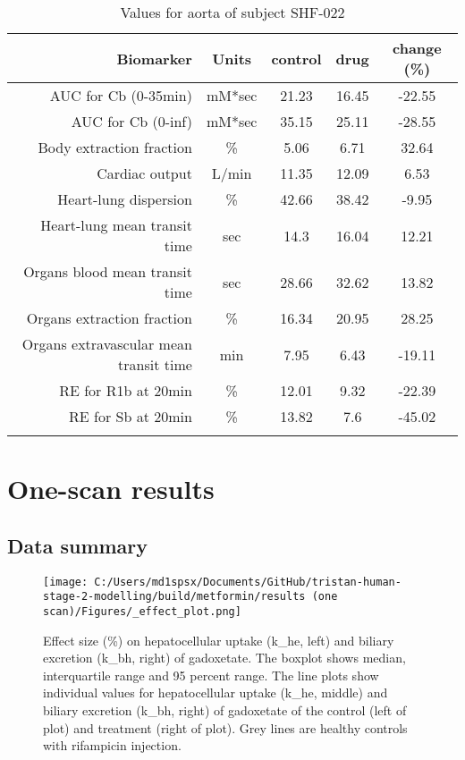 \documentclass{epflreport}%
\begin{document}
\begin{longtable}{rcccc}%
\hline%
Biomarker&Units&control&drug&change (\%)\\%
\hline%
AUC for Cb (0{-}35min)&mM*sec&21.23&16.45&{-}22.55\\%
AUC for Cb (0{-}inf)&mM*sec&35.15&25.11&{-}28.55\\%
Body extraction fraction&\%&5.06&6.71&32.64\\%
Cardiac output&L/min&11.35&12.09&6.53\\%
Heart{-}lung dispersion&\%&42.66&38.42&{-}9.95\\%
Heart{-}lung mean transit time&sec&14.3&16.04&12.21\\%
Organs blood mean transit time&sec&28.66&32.62&13.82\\%
Organs extraction fraction&\%&16.34&20.95&28.25\\%
Organs extravascular mean transit time&min&7.95&6.43&{-}19.11\\%
RE for R1b at 20min&\%&12.01&9.32&{-}22.39\\%
RE for Sb at 20min&\%&13.82&7.6&{-}45.02\\%
\hline%
\caption{Values for aorta of subject SHF-022} \\%
\end{longtable}%
\clearpage%
\chapter{One{-}scan results}%
\section{Data summary}%
\label{sec:Datasummary}%

%


\begin{figure}[h!]%
\centering%
\texttt{[image: C:/Users/md1spsx/Documents/GitHub/tristan-human-stage-2-modelling/build/metformin/results (one scan)/Figures/\_effect\_plot.png]}%
\caption{Effect size (\%) on hepatocellular uptake (k\_he, left) and biliary excretion (k\_bh, right) of gadoxetate. The boxplot shows median, interquartile range and 95 percent range. The line plots show individual values for hepatocellular uptake (k\_he, middle) and biliary excretion (k\_bh, right) of gadoxetate of the control (left of plot) and treatment (right of plot). Grey lines are healthy controls with rifampicin injection.}%
\end{figure}
\end{document}
